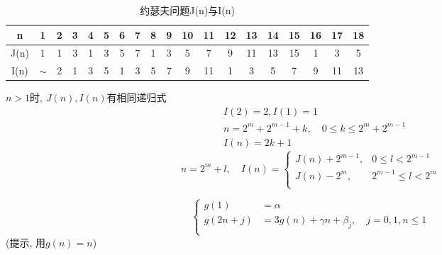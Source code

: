 \begin{answer}
	\begin{table}[htbp]
		\centering
		\small
		\caption{约瑟夫问题J(n)与I(n)}
		\begin{tabular}{c|c cc cccc cccccccc ccc}
			\toprule
			n 
			& 1 
			& 2 & 3 
			& 4 & 5 & 6 & 7 
			& 8 & 9 & 10 & 11 & 12 & 13 & 14 & 15 
			& 16 & 17 & 18 \\
			\midrule
			J(n) 
			& 1 
			& 1 & 3 
			& 1 & 3 & 5 & 7 
			& 1 & 3	& 5 & 7 & 9 & 11 & 13 & 15
			& 1 & 3 & 5 \\
			\midrule
			I(n) 
			& $\sim$ 
			& 2  
			& 1 & 3 & 5  
			& 1 & 3	& 5 & 7 & 9 & 11 
			& 1 & 3	& 5 & 7 & 9 & 11 &13 \\
			\bottomrule
		\end{tabular}%
		\label{tab:JNIN}%
	\end{table}%

$ n >1 $时,  $ J(n), I(n) $有相同递归式
\begin{align*}
	& I(2) = 2, I(1) = 1\\
	& n=2^m + 2^{m-1}+k, \quad 0\leqslant k \leqslant 2^m + 2^{m-1}\\
	& I(n) = 2k+1 
\end{align*}
\begin{equation*}
	n = 2^m + l ,\quad I(n) =
	\left\{
	\begin{array}{ll}
		J(n)+2^{m-1}, 	& 0 		\leqslant l < 2^{m-1} 	\\
		J(n)-2^{m}, 	& 2^{m-1}	\leqslant l < 2^{m} 	\\
	\end{array}
	\right.
\end{equation*}
\end{answer}

\begin{exercise}
	\begin{equation*}
		\left\{
		\begin{array}{rl}
			g(1) 	&= \alpha	\\
			g(2n+j)	&= 3g(n)+\gamma n + \beta_j, \quad j=0,1, n\leqslant 1\\
		\end{array}
		\right.
	\end{equation*}
(提示, 用$ g(n)=n $)
\end{exercise}

